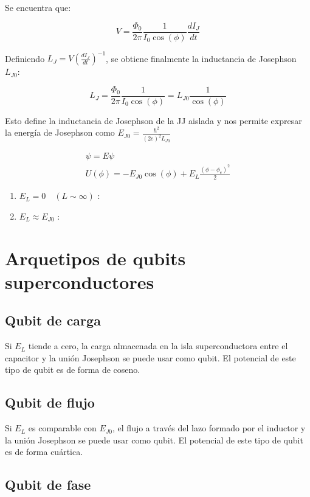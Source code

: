 Se encuentra que:

\[
V = \frac{\Phi_0}{2\pi} \frac{1}{I_0\cos(\phi)} \frac{dI_J}{dt}
\]

Definiendo $L_J = V (\frac{dI_J}{dt})^{-1}$, se obtiene finalmente la inductancia de Josephson $L_{J0}$:

\[
L_J = \frac{\Phi_0}{2\pi} \frac{1}{I_0 \cos(\phi)} = L_{J0} \frac{1}{\cos(\phi)}
\]

Esto define la inductancia de Josephson de la JJ aislada y nos permite expresar la energía de Josephson como $E_{J0} = \frac{\hbar^2}{(2e)^2L_{J0}}$

\begin{align*}
[E_C (-i\hbar \frac{\partial}{\partial\phi}-n_g)^2 + U(\phi)] \psi = E \psi \\
U(\phi) = -E_{J0} \cos(\phi) + E_L \frac{(\phi-\phi_e)^2}{2}
\end{align*}

\begin{enumerate}
\item $E_L = 0 \quad (L \sim \infty)$ :
\item $E_L \approx E_{J0}$ :
\end{enumerate}

\section{Arquetipos de qubits superconductores}

\subsection{Qubit de carga}

Si $E_L$ tiende a cero, la carga almacenada en la isla superconductora entre el capacitor y  la unión Josephson se puede usar como qubit. El potencial de este tipo de qubit es de forma de coseno.

\subsection{Qubit de flujo}

Si $E_L$ es comparable con $E_{J0}$, el flujo a través del lazo formado por el inductor y la unión Josephson se puede usar como qubit. El potencial de este tipo de qubit es de forma cuártica.

\subsection{Qubit de fase}

